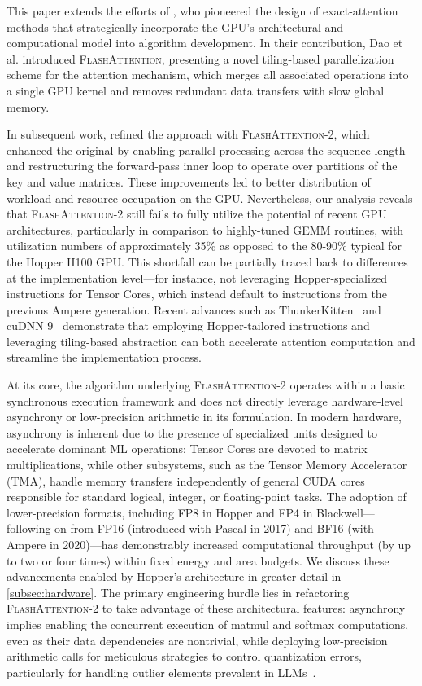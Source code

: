 This paper extends the efforts of \citet{dao2022flashattention}, who pioneered the design of exact-attention methods that strategically incorporate the GPU's architectural and computational model into algorithm development. In their contribution, Dao et al. introduced \textsc{FlashAttention}, presenting a novel tiling-based parallelization scheme for the attention mechanism, which merges all associated operations into a single GPU kernel and removes redundant data transfers with slow global memory. 

In subsequent work, \citet{dao2023flashattention2} refined the approach with \textsc{FlashAttention-2}, which enhanced the original by enabling parallel processing across the sequence length and restructuring the forward-pass inner loop to operate over partitions of the key and value matrices. These improvements led to better distribution of workload and resource occupation on the GPU. Nevertheless, our analysis reveals that \textsc{FlashAttention-2} still fails to fully utilize the potential of recent GPU architectures, particularly in comparison to highly-tuned GEMM routines, with utilization numbers of approximately 35\% as opposed to the 80-90\% typical for the Hopper H100 GPU. This shortfall can be partially traced back to differences at the implementation level—for instance, not leveraging Hopper-specialized instructions for Tensor Cores, which instead default to instructions from the previous Ampere generation. Recent advances such as ThunkerKitten~\citep{spector2024thunder} and cuDNN 9~\citep{cudnn9} demonstrate that employing Hopper-tailored instructions and leveraging tiling-based abstraction can both accelerate attention computation and streamline the implementation process.

At its core, the algorithm underlying \textsc{FlashAttention-2} operates within a basic synchronous execution framework and does not directly leverage hardware-level asynchrony or low-precision arithmetic in its formulation. In modern hardware, asynchrony is inherent due to the presence of specialized units designed to accelerate dominant ML operations: Tensor Cores are devoted to matrix multiplications, while other subsystems, such as the Tensor Memory Accelerator (TMA), handle memory transfers independently of general CUDA cores responsible for standard logical, integer, or floating-point tasks. The adoption of lower-precision formats, including FP8 in Hopper and FP4 in Blackwell—following on from FP16 (introduced with Pascal in 2017) and BF16 (with Ampere in 2020)—has demonstrably increased computational throughput (by up to two or four times) within fixed energy and area budgets. We discuss these advancements enabled by Hopper’s architecture in greater detail in \cref{subsec:hardware}. The primary engineering hurdle lies in refactoring \textsc{FlashAttention-2} to take advantage of these architectural features: asynchrony implies enabling the concurrent execution of matmul and softmax computations, even as their data dependencies are nontrivial, while deploying low-precision arithmetic calls for meticulous strategies to control quantization errors, particularly for handling outlier elements prevalent in LLMs~\citep{dettmers2208llm, sun2024massive}.

